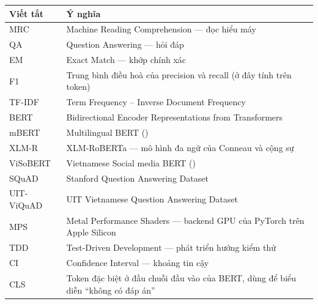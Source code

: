 \begin{center}
\renewcommand{\arraystretch}{1.15}
\begin{tabularx}{\textwidth}{@{}l L@{}}
\toprule
\textbf{Viết tắt} & \textbf{Ý nghĩa} \\
\midrule
MRC       & Machine Reading Comprehension --- đọc hiểu máy \\
QA        & Question Answering --- hỏi đáp \\
EM        & Exact Match --- khớp chính xác \\
F1        & Trung bình điều hoà của precision và recall (ở đây tính trên token) \\
TF-IDF    & Term Frequency -- Inverse Document Frequency \\
BERT      & Bidirectional Encoder Representations from Transformers \\
mBERT     & Multilingual BERT () \\
XLM-R     & XLM-RoBERTa --- mô hình đa ngữ của Conneau và cộng sự \\
ViSoBERT  & Vietnamese Social media BERT () \\
SQuAD     & Stanford Question Answering Dataset \\
UIT-ViQuAD & UIT Vietnamese Question Answering Dataset \\
MPS       & Metal Performance Shaders --- backend GPU của PyTorch trên Apple Silicon \\
TDD       & Test-Driven Development --- phát triển hướng kiểm thử \\
CI        & Confidence Interval --- khoảng tin cậy \\
CLS       & Token đặc biệt ở đầu chuỗi đầu vào của BERT, dùng để biểu diễn ``không có đáp án'' \\
\bottomrule
\end{tabularx}
\end{center}
